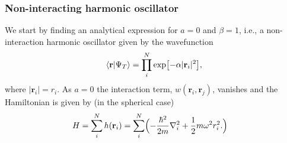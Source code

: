\documentclass[
    a4paper, aps, twocolumn, floatfix, superscriptaddress]{revtex4-1}
\newcommand{\vf}{\mathbf}
\newcommand{\1}{\mathds{1}}
\newcommand{\half}{\frac{1}{2}}
\begin{document}
        \subsubsection{Non-interacting harmonic oscillator}
            We start by finding an analytical expression for $a = 0$ and $\beta
            = 1$, i.e., a non-interaction harmonic oscillator given by the
            wavefunction
            \begin{align}
                \bra{\vf{r}}\ket{\Psi_T}
                = \prod_i^N \exp\bigl[
                    -\alpha |\vf{r}_i|^2
                \bigr],
            \end{align}
            where $|\vf{r}_i| = r_i$. As $a = 0$ the interaction term,
            $w(\vf{r}_i, \vf{r}_j)$, vanishes and the Hamiltonian is given by
            (in the spherical case)
            \begin{align}
                H &= \sum_i^N h(\vf{r}_i)
                = \sum_i^N \Bigl(
                    -\frac{\hbar^2}{2m}\nabla_i^2
                    + \half m \omega^2 r_i^2.
                \Bigr)
            \end{align}
\end{document}
